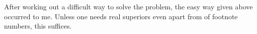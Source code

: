 \documentclass{article}
\begin{document}
After working out a difficult way to solve the problem, the easy way
given above occurred to me.  Unless one needs real superiors even
apart from of footnote numbers, this suffices.
\end{document}
